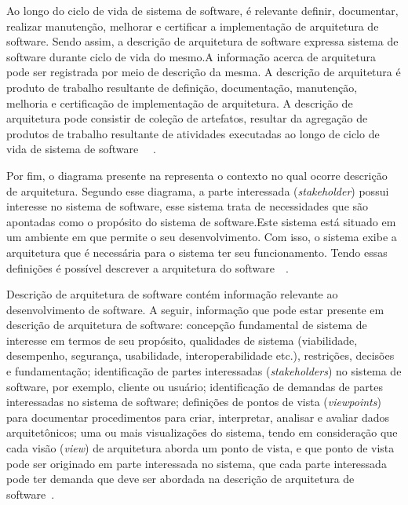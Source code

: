 Ao longo do ciclo de vida de sistema de software, é relevante definir, documentar, realizar manutenção, melhorar e certificar a implementação de arquitetura de software. Sendo assim, a descrição de arquitetura de software expressa sistema de software durante ciclo de vida do mesmo.A informação acerca de arquitetura pode ser registrada por meio de descrição da mesma. 
A descrição de arquitetura é produto de trabalho resultante de definição, documentação, manutenção, melhoria e certificação de implementação de  arquitetura. A descrição de arquitetura pode consistir de coleção de artefatos, resultar da agregação de produtos de trabalho resultante de atividades executadas ao longo de ciclo de vida de sistema de software  ~\cite{ISO_1471}~\cite{ISO_42010}. 

%

Por fim, o diagrama presente na  representa o contexto no qual ocorre descrição de arquitetura. Segundo esse diagrama, a parte interessada (\emph{stakeholder}) possui interesse no sistema de software, esse sistema trata de necessidades que são apontadas como o propósito do sistema de software.Este sistema está situado em um ambiente em que permite o seu desenvolvimento. Com isso, o sistema exibe a arquitetura que é necessária para o sistema ter seu funcionamento. Tendo essas definições é possível descrever a arquitetura do software~\cite{ISO_1471}~\cite{ISO_42010}. 

Descrição de arquitetura de software contém informação relevante ao desenvolvimento de software. A seguir, informação que pode estar presente em descrição de arquitetura de software: concepção fundamental de sistema de interesse em termos de seu propósito, qualidades de sistema (viabilidade, desempenho, segurança, usabilidade, interoperabilidade etc.), restrições, decisões e fundamentação; identificação de partes interessadas (\emph{stakeholders}) no sistema de software, por exemplo, cliente ou usuário; identificação de demandas de partes interessadas no sistema de software; definições de pontos de vista (\emph{viewpoints}) para documentar procedimentos para criar, interpretar, analisar e avaliar dados arquitetônicos; uma ou mais visualizações do sistema, tendo em consideração que cada visão (\emph{view}) de arquitetura aborda um ponto de vista, e que ponto de vista pode ser originado em parte interessada no sistema, que cada parte interessada pode ter demanda que deve ser abordada na descrição de arquitetura de software~\cite{ISO_15289}. 

